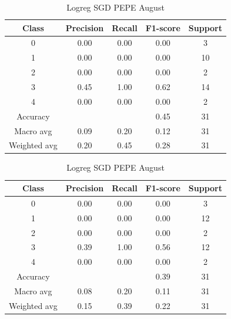 \begin{enumerate}
\begin{enumerate}
            \begin{table}[H]
            \centering
            \scriptsize
            \begin{minipage}{0.48\textwidth}
            \centering
            \begin{tabular}{c|cccc}
            \hline
            Class & Precision & Recall & F1-score & Support \\
            \hline
            0 & 0.00 & 0.00 & 0.00 & 3 \\
            1 & 0.00 & 0.00 & 0.00 & 10 \\
            2 & 0.00 & 0.00 & 0.00 & 2 \\
            3 & 0.45 & 1.00 & 0.62 & 14 \\
            4 & 0.00 & 0.00 & 0.00 & 2 \\
            \hline
            Accuracy &       &      & 0.45 & 31 \\
            Macro avg & 0.09 & 0.20 & 0.12 & 31 \\
            Weighted avg & 0.20 & 0.45 & 0.28 & 31 \\
            \hline
            \end{tabular}
            \caption{Logreg SGD DOGE August}
            \label{tab:classifier_2_report_logreg_sgd_doge_filtered_aug}
            \end{minipage}%
            \hfill
            \begin{minipage}{0.48\textwidth}
            \centering
            \begin{tabular}{c|cccc}
            \hline
            Class & Precision & Recall & F1-score & Support \\
            \hline
            0 & 0.00 & 0.00 & 0.00 & 3 \\
            1 & 0.00 & 0.00 & 0.00 & 12 \\
            2 & 0.00 & 0.00 & 0.00 & 2 \\
            3 & 0.39 & 1.00 & 0.56 & 12 \\
            4 & 0.00 & 0.00 & 0.00 & 2 \\
            \hline
            Accuracy &       &      & 0.39 & 31 \\
            Macro avg & 0.08 & 0.20 & 0.11 & 31 \\
            Weighted avg & 0.15 & 0.39 & 0.22 & 31 \\
            \hline
            \end{tabular}
            \caption{Logreg SGD PEPE August}
            \label{tab:classifier_2_report_logreg_sgd_pepe_filtered_aug}
            \end{minipage}
            

\end{table}
\end{enumerate}
\end{enumerate}
